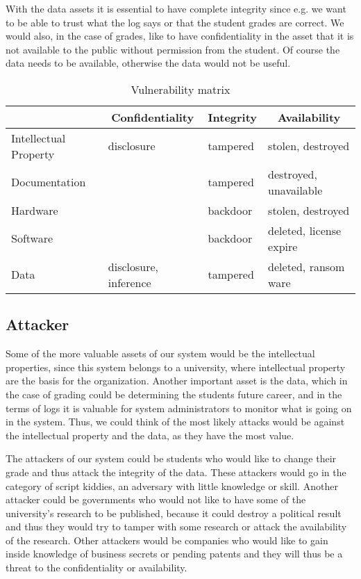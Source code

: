 With the data assets it is essential to have complete integrity since
e.g. we want to be able to trust what the log says or that the student
grades are correct. We would also, in the case of grades, like to have
confidentiality in the asset that it is not available to the public
without permission from the student. Of course the data needs to be
available, otherwise the data would not be useful.

\begin{table}[h!]
  \centering
  \begin{tabular}{l|l|l|l}
    \multicolumn{1}{c|}{} & \multicolumn{1}{c|}{\textbf{Confidentiality}} & \multicolumn{1}{c|}{\textbf{Integrity}} & \multicolumn{1}{c}{\textbf{Availability}} \\ \hline
    Intellectual Property & disclosure & tampered & stolen, destroyed \\ \hline
    Documentation & & tampered & destroyed, unavailable \\ \hline
    Hardware & & backdoor & stolen, destroyed \\ \hline
    Software & & backdoor & deleted, license expire \\ \hline
    Data & disclosure, inference & tampered & deleted, ransom ware
  \end{tabular}
  \caption{\label{tbl:vul-matrix} Vulnerability matrix}
\end{table}

\subsection{Attacker}
Some of the more valuable assets of our system would be the
intellectual properties, since this system belongs to a university,
where intellectual property are the basis for the
organization. Another important asset is the data, which in the case
of grading could be determining the students future career, and in the
terms of logs it is valuable for system administrators to monitor what
is going on in the system. Thus, we could think of the most likely
attacks would be against the intellectual property and the data, as
they have the most value.

The attackers of our system could be students who would like to change
their grade and thus attack the integrity of the data. These attackers
would go in the category of script kiddies, an adversary with little
knowledge or skill. Another attacker could be governments who would
not like to have some of the university's research to be published,
because it could destroy a political result and thus they would try to
tamper with some research or attack the availability of the
research. Other attackers would be companies who would like to gain
inside knowledge of business secrets or pending patents and they will
thus be a threat to the confidentiality or availability.

